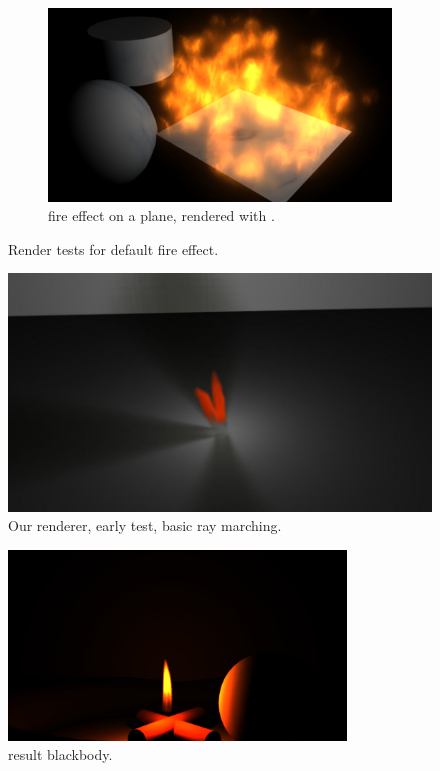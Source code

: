 \begin{figure}[htpb!]
        \ContinuedFloat
 		\begin{subfigure}[t]{\textwidth}
                \includegraphics[width=\textwidth]{img/maya_fire_mental_ray}
                \caption{\Maya fire effect on a plane, rendered with \MentalRay.}
                \label{fig:maya_fire_mental_ray}
        \end{subfigure}%
        \caption{Render tests for \Maya default fire effect.}
        \label{fig:maya_fire_scenes}
\end{figure}

\begin{figure}[htbp!]
	\centering
	\includegraphics[width=\textwidth]{img/result_early_stage}
	\caption{Our renderer, early test, basic ray marching.}
	\label{fig:result_early_stage}
\end{figure}

\begin{figure}[htbp!]
	\centering
	\includegraphics[width=0.8\textwidth, trim={8cm 0 8cm 10cm}, clip]{img/result_blackbody}
	\caption{result blackbody.}
	\label{fig:result_blackbody}
\end{figure}


